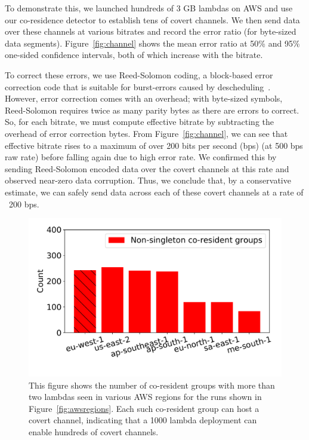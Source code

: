 To demonstrate this, we launched hundreds of 3 GB lambdas on AWS and use our
co-residence detector to establish tens of covert channels. We then send data
over these channels at various bitrates and record the error ratio (for
byte-sized data segments). Figure~\ref{fig:channel} shows the mean error ratio
at 50\% and 95\% one-sided confidence intervals, both of which increase with the bitrate.

To correct these errors, we use Reed-Solomon coding, a block-based error correction 
code that is suitable for burst-errors caused by descheduling~\cite{wuusenix2012}. 
However, error correction comes with an overhead; with byte-sized symbols,
Reed-Solomon requires twice as many parity bytes as there are errors to correct. 
So, for each bitrate, we must compute
effective bitrate by subtracting the overhead of error correction bytes.
From Figure~\ref{fig:channel}, we can see that effective bitrate rises to a
maximum of over 200 bits per second (bps) (at 500 bps raw rate) before falling
again due to high error rate. We confirmed this by sending Reed-Solomon encoded
data over the covert channels at this rate and observed near-zero data
corruption. Thus, we conclude that, by a conservative estimate, we can safely
send data across each of these covert channels at a rate of ~200 bps.



\begin{figure}[!t]
  \includegraphics[width=.99\linewidth]{fig/clusters.pdf}
  \caption{This figure shows the number of co-resident groups with more than two lambdas
  seen in various AWS regions for the runs shown in Figure~\ref{fig:awsregions}. 
  Each such co-resident group can host a covert channel, indicating that a 1000 lambda 
  deployment can enable hundreds of covert channels.
\label{fig:clusters}}
\end{figure}


